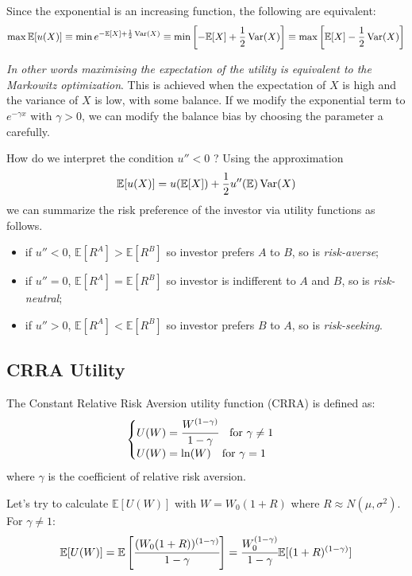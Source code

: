 Since the exponential is an increasing function, the following are equivalent:
\begin{equation*}
\max \mathbb{E}[u(X)] \equiv \min e^{-\mathbb{E}[X]+ \frac{1}{2}\operatorname{Var}(X)} \equiv \min\left[-\mathbb{E}[X] + \frac{1}{2}\operatorname{Var}(X)\right] \equiv \max\left[\mathbb{E}[X] - \frac{1}{2}\operatorname{Var}(X)\right]
\end{equation*}

\emph{In other words maximising the expectation of the utility is equivalent to the Markowitz optimization}.
This is achieved when the expectation of $X$ is high and the variance of $X$ is low, with some balance. If we modify the exponential term to $e^{-\gamma x}$ with $\gamma > 0$, we can modify the balance bias by choosing the parameter a carefully.

How do we interpret the condition $u''<0$ ? Using the approximation
\begin{equation*}
  \mathbb{E}[u(X)] = u (\mathbb{E}[X]) + \frac{1}{2}u''(\mathbb{E})\operatorname{Var}(X)
\end{equation*}
we can summarize the risk preference of the investor via utility functions as follows.
\begin{itemize}
\item if $u'' < 0$, $\mathbb{E}[R^A] > \mathbb{E}[R^B]$ so investor prefers $A$ to $B$, so is \emph{risk-averse};
\item if $u'' = 0$, $\mathbb{E}[R^A] = \mathbb{E}[R^B]$ so investor is indifferent to $A$ and $B$, so is \emph{risk-neutral};
\item if $u'' > 0$, $\mathbb{E}[R^A] < \mathbb{E}[R^B]$ so investor prefers $B$ to $A$, so is \emph{risk-seeking}.
\end{itemize}

\subsection{CRRA Utility}

The Constant Relative Risk Aversion utility function (CRRA) is defined as:
\begin{equation}
\begin{cases}
U(W) = \cfrac{W^{(1-\gamma)}}{1-\gamma}\quad\text{for $\gamma \neq 1$}\\
U(W) = \ln(W)\quad\text{for $\gamma = 1$}
\end{cases}
\end{equation}
where $\gamma$ is the coefficient of relative risk aversion.

Let's try to calculate $\mathbb{E}[U(W)]$ with $W = W_0(1 + R)$ where $R\approx N(\mu, \sigma^2)$.
For $\gamma\neq 1$:
\begin{equation*}
\mathbb{E}[U(W)] = \mathbb{E}\left[\cfrac{(W_0(1 + R))^{(1-\gamma)}}{1-\gamma}\right] = \cfrac{W_0^{(1-\gamma)}}{1-\gamma}\mathbb{E}[(1 + R)^{(1-\gamma)}]
\end{equation*}

